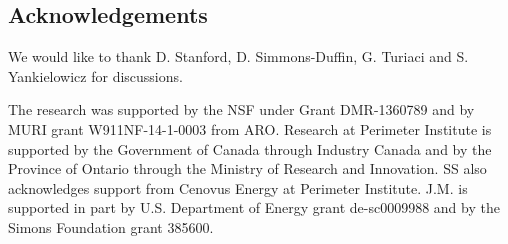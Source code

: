 \documentclass[aps,pre,preprint,onecolumn,citeautoscript,superscriptaddress,nofootinbib,eqsecnum]{revtex4-1}
\begin{document}
\subsection*{Acknowledgements}

We would like to thank D. Stanford, D. Simmons-Duffin, G. Turiaci and S. Yankielowicz for discussions. 

The research was supported by the NSF under Grant DMR-1360789 and by MURI grant W911NF-14-1-0003 from ARO.
Research at Perimeter Institute is supported by the Government of Canada through Industry Canada and by the Province of Ontario 
through the Ministry of Research and Innovation. SS also acknowledges support from Cenovus Energy at Perimeter Institute.
J.M. is supported in part by U.S. Department of Energy grant
de-sc0009988 and by the Simons Foundation grant 385600.




\end{document}
